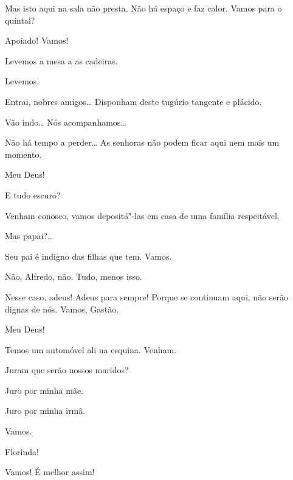 \begin{linenumbers}

 Mas isto aqui na sala não presta. Não há espaço e faz calor.
Vamos para o quintal?

 Apoiado! Vamos!

 Levemos a mesa a as cadeiras.

 Levemos. 

 Entrai, nobres amigos\ldots{} Disponham deste tugúrio tangente
e plácido.

 Vão indo\ldots{} Nós acompanhamos\ldots{} 

{}



 Não há tempo a perder\ldots{} As senhoras não podem ficar aqui nem
mais um momento.

 Meu Deus!

 E tudo escuro?

 Venham conosco, vamos depositá"-las em casa de uma família
respeitável.

 Mas papai?\ldots{}

 Seu pai é indigno das filhas que tem. Vamos.

 Não, Alfredo, não. Tudo, menos isso.

 Nesse caso, adeus! Adeus para sempre! Porque se continuam
aqui, não serão dignas de nós. Vamos, Gastão.

 Meu Deus!  

 Temos um automóvel ali na esquina. Venham.

 Juram que serão nossos maridos?

 Juro por minha mãe.

 Juro por minha irmã.

  Vamos.

 Florinda!

 Vamos! É melhor assim!


\end{linenumbers}
